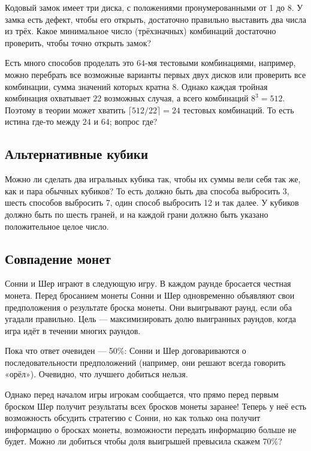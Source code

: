 Кодовый замок имеет три диска, с положениями пронумерованными от 1 до 8.
У замка есть дефект, чтобы его открыть, достаточно правильно выставить два числа из трёх.
Какое минимальное число (трёхзначных) комбинаций достаточно проверить, чтобы точно открыть замок?

Есть много способов проделать это $64$-мя тестовыми комбинациями, например, можно перебрать все возможные варианты первых двух дисков или проверить все комбинации, сумма значений которых кратна 8.
Однако каждая тройная комбинация охватывает $22$ возможных случая, а всего комбинаций $8^3 = 512$. 
Поэтому в теории может хватить $\lceil 512/22 \rceil = 24$ тестовых комбинаций.
То есть истина где-то между $24$ и $64$; вопрос где?

\subsection*{Альтернативные кубики}

Можно ли сделать два игральных кубика так, чтобы их суммы вели себя так же, как и пара обычных кубиков?
То есть должно быть два способа выбросить 3, шесть способов выбросить 7, один способ выбросить 12 и так далее.
У кубиков должно быть по шесть граней, и на каждой грани должно быть указано положительное целое число.

\subsection*{Совпадение монет}

Сонни и Шер играют в следующую игру.
В каждом раунде бросается честная монета.
Перед бросанием монеты Сонни и Шер одновременно объявляют свои предположения о результате броска монеты.
Они выигрывают раунд, если оба угадали правильно.
Цель --- максимизировать долю выигранных раундов, когда игра идёт в течении многих раундов.

Пока что ответ очевиден --- 50\%: Сонни и Шер договариваются о последовательности предположений (например, они решают всегда говорить «орёл»).
Очевидно, что лучшего добиться нельзя.

Однако перед началом игры игрокам сообщается, что прямо перед первым броском Шер получит результаты всех бросков монеты заранее!
Теперь у неё есть возможность обсудить стратегию с Сонни, но как только она получит информацию о бросках монеты, возможности передать информацию больше не будет.
Можно ли добиться чтобы доля выигрышей превысила скажем 70\%?

